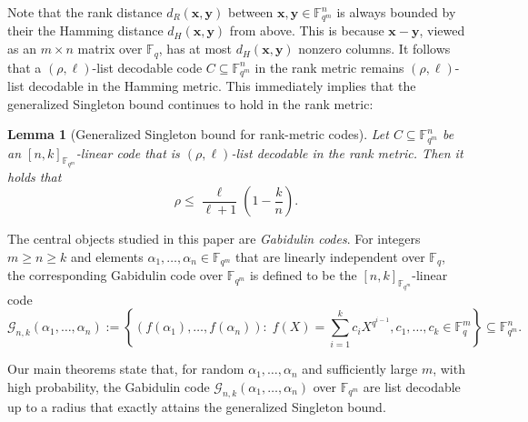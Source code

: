 \documentclass[11pt]{article}
\theoremstyle{plain}
\newtheorem{lemma}[thm]{Lemma}
\theoremstyle{definition}
\theoremstyle{remark}
\newcommand{\F}{\mathbb{F}}
\newcommand{\by}{\bm{y}}
\newcommand{\bx}{\bm{x}}
\def \mG {\mathcal{G}}
\begin{document}
Note that the rank distance $d_R(\bx,\by)$ between $\bx,\by\in\F_{q^m}^n$ is always bounded by their the Hamming distance $d_H(\bx,\by)$ from above. This is because $\bx-\by$, viewed as an $m\times n$ matrix over $\F_q$, has at most $d_H(\bx,\by)$ nonzero columns. It follows that a $(\rho,\ell)$-list decodable code $C\subseteq\F_{q^m}^n$ in the rank metric remains $(\rho,\ell)$-list decodable in the Hamming metric. This immediately implies that the generalized Singleton bound  continues to hold in the rank metric:

\begin{lemma}[Generalized Singleton bound for rank-metric codes]
Let $C\subseteq \F_{q^m}^n$ be an $[n,k]_{\F_{q^m}}$-linear code that is $(\rho,\ell)$-list decodable in the rank metric. Then it holds that
\[
\rho\leq \frac{\ell}{\ell+1}\left(1-\frac{k}{n}\right).
\]
\end{lemma}

The central objects studied in this paper are \emph{Gabidulin codes}.
For integers $m\geq n\geq k$ and elements $\alpha_1,\dotsc, \alpha_n\in\F_{q^m}$ that are linearly independent over $\F_q$, the corresponding Gabidulin code over $\F_{q^m}$ is defined to be the $[n,k]_{\F_{q^m}}$-linear code
\[
\mG_{n,k}(\alpha_1,\dotsc, \alpha_n) := \left\{(f(\alpha_1),\ldots,f(\alpha_n)):\; f(X)=\sum_{i=1}^{k} c_i X^{q^{i-1}}, c_1,\dots,c_k\in \F_q^m\right\}\subseteq \F_{q^m}^n.
\]

Our main theorems state that, for random $\alpha_1,\dots,\alpha_n$ and sufficiently large $m$, with high probability, the Gabidulin code $\mG_{n,k}(\alpha_1,\dotsc, \alpha_n)$ over $\F_{q^m}$ are list decodable up to a radius that exactly attains the generalized Singleton bound.
\end{document}
